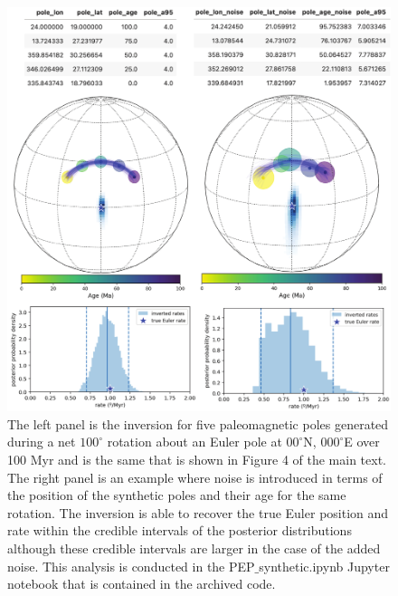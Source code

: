 \documentclass[11pt,letterpaper]{article}
\begin{document}
\begin{figure}[h!]
\noindent\includegraphics[width=5.8 in]{SI_fig_synthetic_noise.pdf}
\caption[Inversion of one Euler pole synthetic data with noise]{The left panel is the inversion for five paleomagnetic poles generated during a net $100^\circ$ rotation about an Euler pole at $00^\circ$N, $000^\circ$E over 100 Myr and is the same that is shown in Figure 4 of the main text. The right panel is an example where noise is introduced in terms of the position of the synthetic poles and their age for the same rotation. The inversion is able to recover the true Euler position and rate within the credible intervals of the posterior distributions although these credible intervals are larger in the case of the added noise. This analysis is conducted in the PEP$\_$synthetic.ipynb Jupyter notebook that is contained in the archived code.}
\label{pdffiguresample}
\end{figure}
\end{document}
